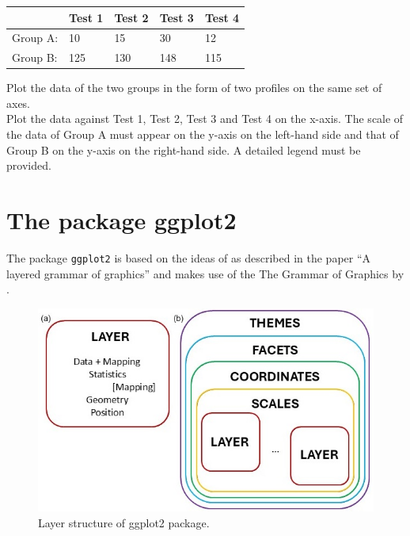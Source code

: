 \documentclass[
]{book}
\begin{document}
\begin{longtable}[]{@{}lllll@{}}
\toprule\noalign{}
& Test 1 & Test 2 & Test 3 & Test 4 \\
\midrule\noalign{}
\endhead
\bottomrule\noalign{}
\endlastfoot
Group A: & 10 & 15 & 30 & 12 \\
Group B: & 125 & 130 & 148 & 115 \\
\end{longtable}

Plot the data of the two groups in the form of two profiles on the same set of axes.\\
Plot the data against Test 1, Test 2, Test 3 and Test 4 on the x-axis.
The scale of the data of Group A must appear on the y-axis on the left-hand side and that of Group B on the y-axis on the right-hand side. A detailed legend must be provided.

\section{The package ggplot2}\label{the-package-ggplot2}

The package \texttt{ggplot2} is based on the ideas of \citet{Wickham2010} as described in the paper ``A layered grammar of graphics'' and makes use of the The Grammar of Graphics by \citet{Wilkenson2005}.

\begin{figure}
\includegraphics[width=1\linewidth]{pics/ggplot} \caption{Layer structure of ggplot2 package.}\label{fig:ggplotStructure}
\end{figure}
\end{document}
